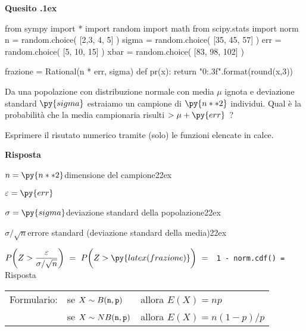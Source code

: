 \documentclass[11pt,twoside,a4paper]{article}
\newcounter{quesito}
\newenvironment{question}{\addtocounter{quesito}{1}\par\textbf{Quesito \thequesito.\kern1ex}}{\vspace{0.5\parskip}}
\newenvironment{answer}{\par\textbf{Risposta\quad}}{\vspace{\parskip}}
\begin{document}
\begin{question} %
\begin{pycode}
from sympy import *
import random
import math
from scipy.stats import norm
n = random.choice( [2,3, 4, 5] )
sigma = random.choice( [35, 45, 57] )
err = random.choice( [5, 10, 15] )
xbar = random.choice( [83, 98, 102] )

frazione =  Rational(n * err, sigma)
def pr(x):
    return "{0:.3f}".format(round(x,3))

\end{pycode}
Da una popolazione con distribuzione normale con media $\mu$ ignota e deviazione standard $\py{sigma}$ estraiamo un campione di $\py{n**2}$ individui. Qual è la probabilità che la media campionaria risulti $>\mu+ \py{err}$~? 
    
Esprimere il risutato numerico tramite (solo) le funzioni elencate in calce.

\begin{answer}
  
  $n = \py{n**2}$\hfill dimensione del campione\kern22ex
  
  $\varepsilon = \py{err}$ 
  
  $\sigma = \py{sigma}$\hfill deviazione standard della popolazione\kern22ex
  
  $\sigma/\sqrt{n}$\hfill errore standard (deviazione standard della media)\kern22ex
  
  $\displaystyle P\bigg(Z>\dfrac {\varepsilon}{\sigma/\sqrt{n}}\bigg)\ =\ P\bigg(Z>\py{latex(frazione)}\bigg)\ =\ ${\color{blue}\tt\ 1 - norm.cdf()}{\tt\ =  }{\color{blue}\hfill Risposta}

\end{answer}
\end{question}






























\vfill\hrulefill\par
\begin{tabular}{@{}lll}
Formulario:& se $X\sim B({\tt n},{\tt p})$ & allora $E(X)=np$\\
           & se $X\sim NB({\tt n},{\tt p})$& allora $E(X)=n(1-p)/p$
\end{tabular}
\end{document}
